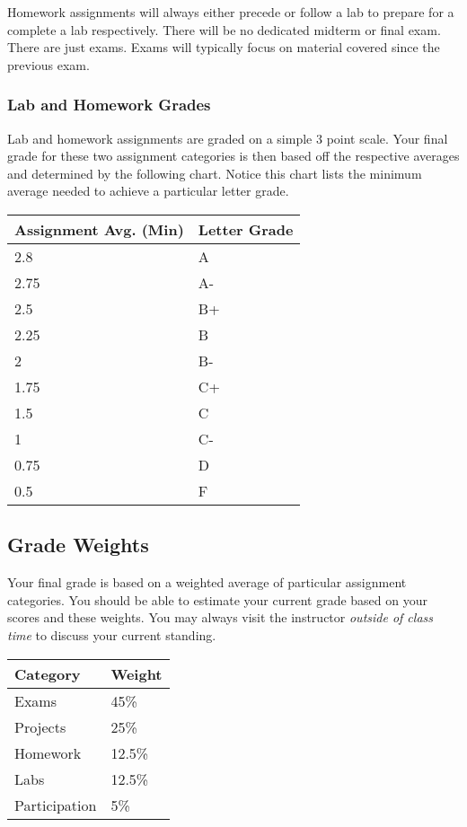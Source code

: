 \documentclass[10pt]{article}
\begin{document}
Homework assignments will always either precede or follow a lab to prepare for a complete a lab respectively. There will be no dedicated midterm or final exam. There are just exams.  Exams will typically focus on material covered since the previous exam.

\subsubsection{Lab and Homework Grades}

Lab and homework assignments are graded on a simple 3 point scale.  Your final grade for these two assignment categories is then based off the respective averages and determined by the following chart.  Notice this chart lists the minimum average needed to achieve a particular letter grade.

\begin{center}
\begin{small}
\begin{tabular}{ll}
Assignment Avg. (Min) & Letter Grade \\ \toprule
2.8   & A  \\
2.75    & A- \\
2.5 & B+ \\
2.25    & B  \\
2   & B- \\
1.75    & C+ \\
1.5 & C  \\
1   & C- \\
0.75    & D  \\
0.5  & F
\end{tabular}
\end{small}
\end{center}

\subsection{Grade Weights}

Your final grade is based on a weighted average of particular assignment categories.  You should be able to estimate your current grade based on your scores and these weights.  You may always visit the instructor \textit{outside of class time} to discuss your current standing.

\begin{center}
  \begin{tabular}{ll}
  Category & Weight \\ \toprule
    Exams & 45\% \\ %
    Projects & 25\% \\ %
    Homework & 12.5\% \\ %
    Labs & 12.5\% \\ %
    Participation & 5\%
  \end{tabular}
\end{center}
\end{document}
